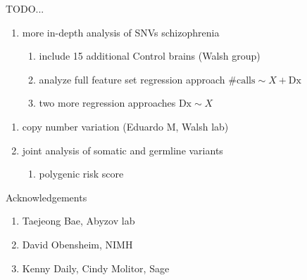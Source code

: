 \documentclass{beamer}
\begin{document}
\begin{frame}{TODO...}
\begin{enumerate}
\item more in-depth analysis of SNVs schizophrenia
\begin{enumerate}
\item include 15 additional Control brains (Walsh group)
\item analyze full feature set regression approach \(\mathrm{\#calls} \sim X + \mathrm{Dx}\)
\item two more regression approaches \(\mathrm{Dx} \sim X\)
\end{enumerate}
\end{enumerate}
\begin{enumerate}
\item copy number variation (Eduardo M, Walsh lab)
\item joint analysis of somatic and germline variants
\begin{enumerate}
\item polygenic risk score
\end{enumerate}
\end{enumerate}
\end{frame}

\begin{frame}{Acknowledgements}
\begin{enumerate}
\item Taejeong Bae, Abyzov lab
\item David Obensheim, NIMH
\item Kenny Daily, Cindy Molitor, Sage
\end{enumerate}
\end{frame}
\end{document}
